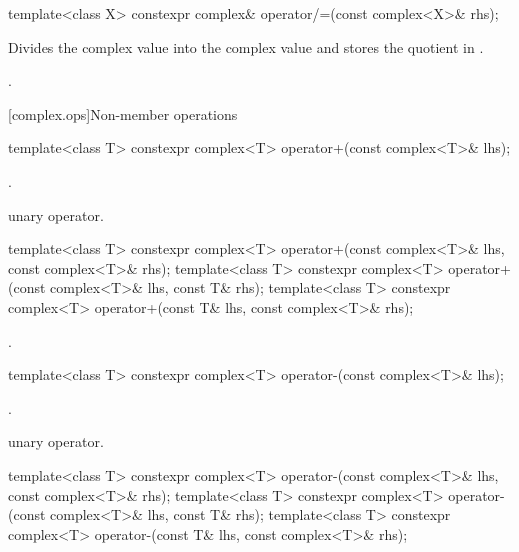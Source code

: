 %
\begin{itemdecl}
template<class X> constexpr complex& operator/=(const complex<X>& rhs);
\end{itemdecl}

\begin{itemdescr}
\pnum
\effects
Divides the complex value  into the complex value
and stores the quotient in
.

\pnum
\returns
{}.
\end{itemdescr}

[complex.ops]{Non-member operations}

%
\begin{itemdecl}
template<class T> constexpr complex<T> operator+(const complex<T>& lhs);
\end{itemdecl}

\begin{itemdescr}
\pnum
\returns
{}.

\pnum
\remarks
unary operator.
\end{itemdescr}

\begin{itemdecl}
template<class T> constexpr complex<T> operator+(const complex<T>& lhs, const complex<T>& rhs);
template<class T> constexpr complex<T> operator+(const complex<T>& lhs, const T& rhs);
template<class T> constexpr complex<T> operator+(const T& lhs, const complex<T>& rhs);
\end{itemdecl}

\begin{itemdescr}
\pnum
\returns
{}.
\end{itemdescr}

%
\begin{itemdecl}
template<class T> constexpr complex<T> operator-(const complex<T>& lhs);
\end{itemdecl}

\begin{itemdescr}
\pnum
\returns
{}.

\pnum
\remarks
unary operator.
\end{itemdescr}

%
\begin{itemdecl}
template<class T> constexpr complex<T> operator-(const complex<T>& lhs, const complex<T>& rhs);
template<class T> constexpr complex<T> operator-(const complex<T>& lhs, const T& rhs);
template<class T> constexpr complex<T> operator-(const T& lhs, const complex<T>& rhs);
\end{itemdecl}

